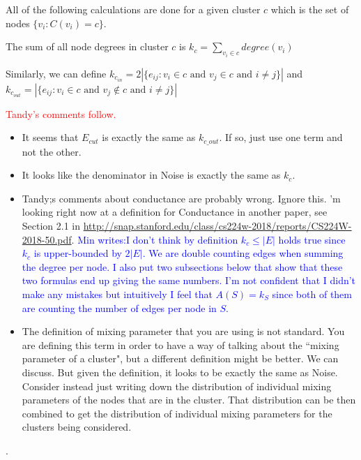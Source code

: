 \documentclass[aps,pre,superscriptaddress]{article}
\begin{document}
All of the following calculations are done for a given cluster $c$ which is the set of nodes $\{v_{i} : C(v_{i}) = c\}$.

The sum of all node degrees in cluster $c$ is $k_{c} = \sum_{v_{i} \in c}{degree(v_{i})}$

Similarly, we can define $k_{c_{in}} = 2|\{e_{ij} : v_{i} \in c \text{ and } v_{j} \in c \text{ and } i \neq j\}|$ and $k_{c_{out}} = |\{e_{ij} : v_{i} \in c \text { and } v_{j} \notin c \text{ and } i \neq j\}|$


\vspace{.1in}
\textcolor{red}{Tandy's comments follow. }

\begin{itemize}

	\item It seems that $E_{cut}$ is exactly the same as $k_{c\_out}$. If so, just use one term and not the other.
	\item It looks like the denominator in Noise is exactly the same as $k_c$.
	\item Tandy;s comments about conductance are probably wrong. Ignore this.
	      'm looking right now at a definition for Conductance in another paper, see Section 2.1 in \url{http://snap.stanford.edu/class/cs224w-2018/reports/CS224W-2018-50.pdf}.    \textcolor{blue}{Min writes:I don't think by definition $k_{c} \leq |E|$ holds true since $k_{c}$ is upper-bounded by $2|E|$. We are double counting edges when summing the degree per node. I also put two subsections below that show that these two formulas end up giving the same numbers. I'm not confident that I didn't make any mistakes but intuitively I feel that $A(S)=k_{S}$ since both of them are counting the number of edges per node in $S$.}
	\item The definition of mixing parameter that you are using is not standard.  You are defining this term in order to have a way of talking about the ``mixing parameter of a cluster", but a different definition might be better. We can discuss.
	      But given the definition, it looks to be exactly the same as Noise.
	      Consider instead just writing down the distribution of individual mixing parameters of the nodes that are in the cluster.
	      That distribution can be then combined to
	      get the distribution of individual mixing
	      parameters for the clusters being considered.
\end{itemize}.
\end{document}
